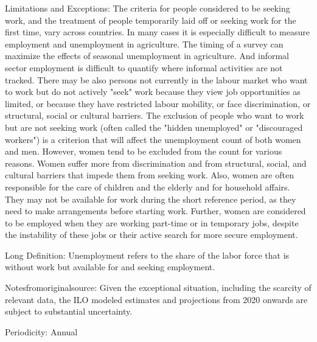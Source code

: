 \documentclass[a4paper]{article}
\begin{document}
Limitations and Exceptions: The criteria for people considered to be seeking work, and the treatment of people temporarily laid off or seeking work for the first time, vary across countries. In many cases it is especially difficult to measure employment and unemployment in agriculture. The timing of a survey can maximize the effects of seasonal unemployment in agriculture. And informal sector employment is difficult to quantify where informal activities are not tracked. There may be also persons not currently in the labour market who want to work but do not actively "seek" work because they view job opportunities as limited, or because they have restricted labour mobility, or face discrimination, or structural, social or cultural barriers. The exclusion of people who want to work but are not seeking work (often called the "hidden unemployed" or "discouraged workers") is a criterion that will affect the unemployment count of both women and men. However, women tend to be excluded from the count for various reasons. Women suffer more from discrimination and from structural, social, and cultural barriers that impede them from seeking work. Also, women are often responsible for the care of children and the elderly and for household affairs. They may not be available for work during the short reference period, as they need to make arrangements before starting work. Further, women are considered to be employed when they are working part-time or in temporary jobs, despite the instability of these jobs or their active search for more secure employment.

Long Definition: Unemployment refers to the share of the labor force that is without work but available for and seeking employment.

Notesfromoriginalsource: Given the exceptional situation, including the scarcity of relevant data, the ILO modeled estimates and projections from 2020 onwards are subject to substantial uncertainty.

Periodicity: Annual
\end{document}
